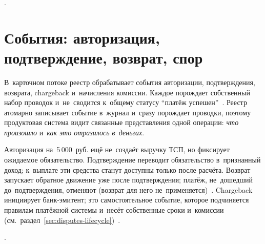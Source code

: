 .

\section{События: авторизация, подтверждение, возврат, спор}\label{sec:ledger-events}

В~карточном потоке реестр обрабатывает события авторизации, подтверждения,
возврата, chargeback и~начисления комиссии. Каждое порождает собственный набор
проводок и~не~сводится к~общему статусу \enquote{платёж
успешен}~\cite{mc-tpr,mc-chargeback-guide,adyen-glossary}. Реестр атомарно
записывает событие в~журнал и~сразу порождает проводки, поэтому продуктовая
система видит связанные представления одной операции: \textit{что
произошло} и~\textit{как это отразилось в~деньгах}.

Авторизация на~5\,000~руб. ещё не~создаёт выручку ТСП, но фиксирует ожидаемое
обязательство. Подтверждение переводит обязательство в~признанный доход;
к~выплате эти средства станут доступны только после расчёта. Возврат запускает
обратное движение уже после подтверждения; платёж, не~дошедший
до~подтверждения, отменяют (возврат для него
не~применяется)~\cite{adyen-glossary,stripe-manual-capture}. Chargeback
инициирует банк-эмитент; это самостоятельное событие, которое подчиняется
правилам платёжной системы и~несёт собственные сроки и~комиссии
(см.~раздел~\ref{sec:disputes-lifecycle})~\cite{adyen-glossary,mc-chargeback-guide}.


.

